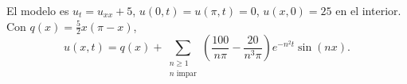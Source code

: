 El modelo es $u_t=u_{xx}+5$, $u(0,t)=u(\pi,t)=0$, $u(x,0)=25$ en el interior. Con $q(x)=\frac52x(\pi-x)$, \[u(x,t)=q(x)+\sum_{\substack{n\ge1\\n\text{ impar}}}\left(\frac{100}{n\pi}-\frac{20}{n^3\pi}\right)e^{-n^2t}\sin(nx).\]
